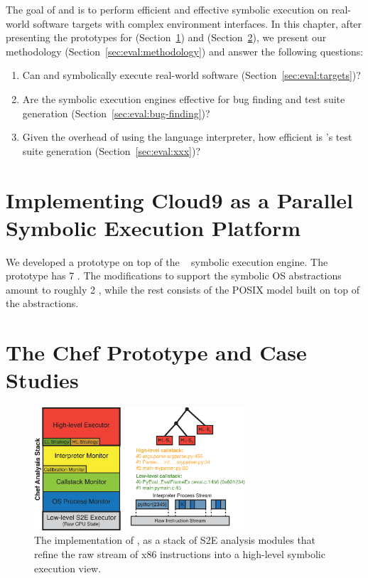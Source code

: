 The goal of \chef and \cnine is to perform efficient and effective symbolic execution on real-world software targets with complex environment interfaces.
%
In this chapter, after presenting the prototypes for \cnine (Section~\ref{sec:eval:cnine-proto}) and \chef (Section~\ref{sec:eval:chef-proto}), we present our methodology (Section~\ref{sec:eval:methodology}) and answer the following questions:
\begin{enumerate}
\item Can \chef and \cnine symbolically execute real-world software (Section~\ref{sec:eval:targets})?
\item Are the symbolic execution engines effective for bug finding and test suite generation (Section~\ref{sec:eval:bug-finding})?
\item Given the overhead of using the language interpreter, how efficient is \chef's test suite generation (Section~\ref{sec:eval:xxx})?
\end{enumerate}

\section{Implementing Cloud9 as a Parallel Symbolic Execution Platform}
\label{sec:eval:cnine-proto}


We developed a \cnine prototype on top of the \klee~\cite{klee} symbolic execution engine.  The prototype has 7 \kloc.
%
The \klee modifications to support the symbolic OS abstractions amount to roughly 2 \kloc, while the rest consists of the POSIX model built on top of the abstractions.

\section{The Chef Prototype and Case Studies}
\label{sec:eval:chef-proto}

\begin{figure}
  \centering
  \includegraphics[width=0.7\textwidth]{figures/evaluation/chef-implem-stack}
  \caption{The implementation of \chef, as a stack of S2E analysis modules that refine the raw stream of x86 instructions into a high-level symbolic execution view.}
  \label{fig:eval:chef-implem-stack}
\end{figure}

